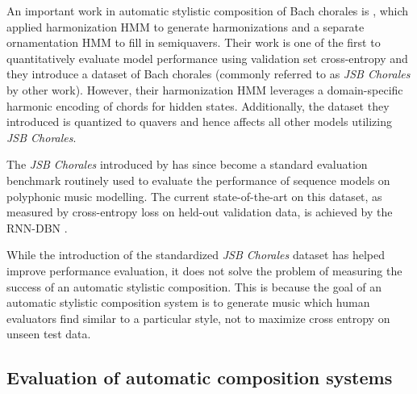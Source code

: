 An important work in automatic stylistic composition of Bach chorales is
\citet{Allan2005}, which applied harmonization HMM to generate harmonizations
and a separate ornamentation HMM to fill in semiquavers. Their work is one of
the first to quantitatively evaluate model performance using validation set
cross-entropy and they introduce a dataset of Bach chorales (commonly referred
to as \textit{JSB Chorales} by other work). However, their harmonization
HMM leverages a domain-specific harmonic encoding of chords for hidden states.
Additionally, the dataset they introduced is quantized to quavers and hence
affects all other models utilizing \textit{JSB Chorales}.

The \textit{JSB Chorales} introduced by \citet{Allan2005} has since become a
standard evaluation benchmark routinely used
\citep{Boulanger-Lewandowski2012,pascanu2013construct,bayer2013fast,goel2014polyphonic,zaremba2015empirical}
to evaluate the performance of sequence models on polyphonic music modelling.
The current state-of-the-art on this dataset, as measured by cross-entropy loss
on held-out validation data, is achieved by the RNN-DBN
\citep{goel2014polyphonic}.

While the introduction of the standardized \textit{JSB Chorales} dataset has
helped improve performance evaluation, it does not solve the problem of
measuring the success of an automatic stylistic composition. This is because
the goal of an automatic stylistic composition system is to generate music
which human evaluators find similar to a particular style, not to maximize cross
entropy on unseen test data.



\subsection{Evaluation of automatic composition systems}


